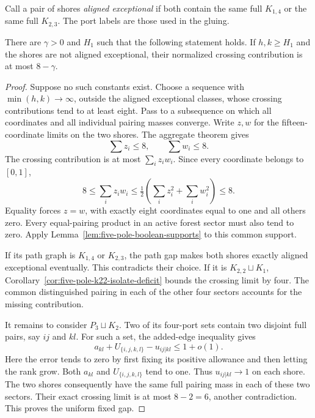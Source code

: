 Call a pair of shores \emph{aligned exceptional} if both contain the same full $K_{1,4}$ or the same full $K_{2,3}$.
The port labels are those used in the gluing.

\begin{lemma}
\label{lem:five-cut-fixed-profile-gap}
There are $\gamma>0$ and $H_1$ such that the following statement holds.
If $h,k\ge H_1$ and the shores are not aligned exceptional, their normalized crossing contribution is at most $8-\gamma$.
\end{lemma}

\begin{proof}
Suppose no such constants exist.
Choose a sequence with $\min(h,k)\to\infty$, outside the aligned exceptional classes, whose crossing contributions tend to at least eight.
Pass to a subsequence on which all coordinates and all individual pairing masses converge.
Write $z,w$ for the fifteen-coordinate limits on the two shores.
The aggregate theorem gives
\[
 \sum z_i\le8,\qquad \sum w_i\le8.
\]
The crossing contribution is at most $\sum_i z_iw_i$.
Since every coordinate belongs to $[0,1]$,
\[
 8\le\sum_i z_iw_i
 \le\tfrac12\left(\sum_i z_i^2+\sum_i w_i^2\right)\le8.
\]
Equality forces $z=w$, with exactly eight coordinates equal to one and all others zero.
Every equal-pairing product in an active forest sector must also tend to zero.
Apply Lemma~\ref{lem:five-pole-boolean-supports} to this common support.

If its path graph is $K_{1,4}$ or $K_{2,3}$, the path gap makes both shores exactly aligned exceptional eventually.
This contradicts their choice.
If it is $K_{2,2}\sqcup K_1$, Corollary~\ref{cor:five-pole-k22-isolate-deficit} bounds the crossing limit by four.
The common distinguished pairing in each of the other four sectors accounts for the missing contribution.

It remains to consider $P_3\sqcup K_2$.
Two of its four-port sets contain two disjoint full pairs, say $ij$ and $kl$.
For such a set, the added-edge inequality gives
\[
 a_{kl}+U_{\{i,j,k,l\}}-u_{ij|kl}\le1+o(1).
\]
Here the error tends to zero by first fixing its positive allowance and then letting the rank grow.
Both $a_{kl}$ and $U_{\{i,j,k,l\}}$ tend to one.
Thus $u_{ij|kl}\to1$ on each shore.
The two shores consequently have the same full pairing mass in each of these two sectors.
Their exact crossing limit is at most $8-2=6$, another contradiction.
This proves the uniform fixed gap.
\end{proof}


